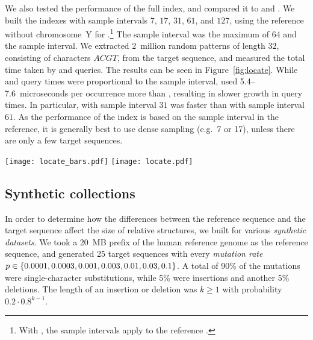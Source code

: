 We also tested the \locate{} performance of the full \RFM{} index, and
compared it to \SSA{} and \SSArrr. We built the indexes with \SA{} sample
intervals $7$, $17$, $31$, $61$, and $127$, using the reference without
chromosome~Y for \RFM.\footnote{With \RFM, the sample intervals apply
to the reference \SSA.} The \ISA{} sample interval was the
maximum of $64$ and the \SA{} sample interval. We extracted 2~million
random patterns of length $32$, consisting of characters $ACGT$, from
the target sequence, and measured the total time taken by \find{} and
\locate{} queries. The results can be seen in
Figure~\ref{fig:locate}. While \SSA{} and \SSArrr{} query times were
proportional to the sample interval, \RFM{} used 5.4\nobreakdash--7.6~microseconds
per occurrence more than \SSA{}, resulting in slower growth in query times.
In particular, \RFM{} with sample interval $31$ was faster than
\SSA{} with sample interval $61$. As the \locate{} performance of the \RFM{}
index is based on the sample interval in the reference, it is generally best
to use dense sampling (e.g.~7 or 17), unless there are only a few target
sequences.

\begin{figure*}
\begin{center}
\texttt{[image: locate\_bars.pdf]}%
\hspace{-0.6in}%
\texttt{[image: locate.pdf]}
\end{center}
\caption{Average \find{} and \locate{} times in microseconds per occurrence for 2~million patterns
of length $32$ with a total of 255~million occurrences on NA12878 relative to
the human reference genome without chromosome~Y. Left: Query time vs.\ suffix array
sample interval. Right: Query time vs.\ index size in bits per character.}\label{fig:locate}
\end{figure*}

\subsection{Synthetic collections}

In order to determine how the differences between the reference sequence and
the target sequence affect the size of relative structures, we built \RCST{}
for various \emph{synthetic datasets}. We took a 20~MB prefix of the human
reference genome as the reference sequence, and generated 25 target
sequences with every \emph{mutation rate} $p \in \{ 0.0001, 0.0003, 0.001, 0.003,
0.01, 0.03, 0.1 \}$. A total of 90\% of the mutations were single-character
substitutions, while 5\% were insertions and another 5\% deletions. The length of an
insertion or deletion was $k \ge 1$ with probability $0.2 \cdot 0.8^{k-1}$.

